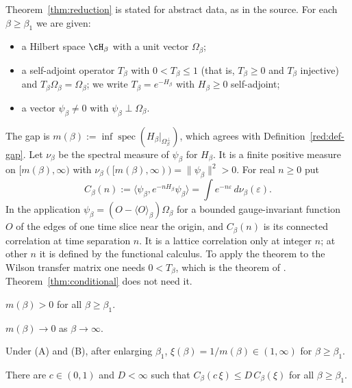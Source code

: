 Theorem~\ref{thm:reduction} is stated for abstract data, as in the source. For each $\beta\ge\beta_1$ we are given:
\begin{itemize}
\item a Hilbert space $\cH_\beta$ with a unit vector $\Omega_\beta$;
\item a self-adjoint operator $T_\beta$ with $0<T_\beta\le1$ (that is, $T_\beta\ge0$ and $T_\beta$ injective) and $T_\beta\Omega_\beta=\Omega_\beta$; we write $T_\beta=e^{-H_\beta}$ with $H_\beta\ge0$ self-adjoint;
\item a vector $\psi_\beta\ne0$ with $\psi_\beta\perp\Omega_\beta$.
\end{itemize}
The gap is $m(\beta):=\inf\operatorname{spec}(H_\beta|_{\Omega_\beta^\perp})$, which agrees with Definition~\ref{red:def-gap}. Let $\nu_\beta$ be the spectral measure of $\psi_\beta$ for $H_\beta$. It is a finite positive measure on $[m(\beta),\infty)$ with $\nu_\beta([m(\beta),\infty))=\|\psi_\beta\|^2>0$. For real $n\ge0$ put
\begin{equation}\label{red:C}
  C_\beta(n):=\langle\psi_\beta,e^{-nH_\beta}\psi_\beta\rangle=\int e^{-n\varepsilon}\,d\nu_\beta(\varepsilon).
\end{equation}
In the application $\psi_\beta=(O-\langle O\rangle_\beta)\Omega_\beta$ for a bounded gauge-invariant function $O$ of the edges of one time slice near the origin, and $C_\beta(n)$ is its connected correlation at time separation $n$. It is a lattice correlation only at integer $n$; at other $n$ it is defined by the functional calculus. To apply the theorem to the Wilson transfer matrix one needs $0<T_\beta$, which is the theorem of \cite{Lu77}. Theorem~\ref{thm:conditional} does not need it.

\begin{hypothesis}\label{hyp:A}
$m(\beta)>0$ for all $\beta\ge\beta_1$.
\end{hypothesis}

\begin{hypothesis}\label{hyp:B}
$m(\beta)\to0$ as $\beta\to\infty$.
\end{hypothesis}

Under (A) and (B), after enlarging $\beta_1$, $\xi(\beta)=1/m(\beta)\in(1,\infty)$ for $\beta\ge\beta_1$.

\begin{hypothesis}\label{hyp:C}
There are $c\in(0,1)$ and $D<\infty$ such that $C_\beta(c\,\xi)\le D\,C_\beta(\xi)$ for all $\beta\ge\beta_1$.
\end{hypothesis}


